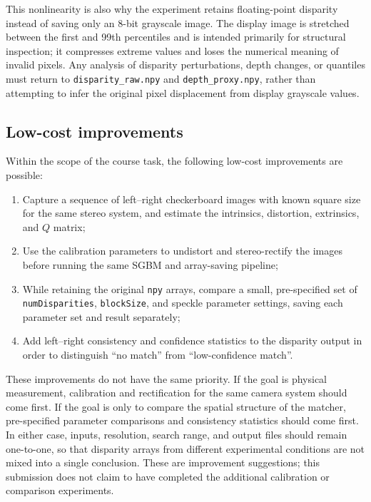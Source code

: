 This nonlinearity is also why the experiment retains floating-point disparity instead of saving only an 8-bit grayscale image. The display image is stretched between the first and 99th percentiles and is intended primarily for structural inspection; it compresses extreme values and loses the numerical meaning of invalid pixels. Any analysis of disparity perturbations, depth changes, or quantiles must return to \texttt{disparity\_raw.npy} and \texttt{depth\_proxy.npy}, rather than attempting to infer the original pixel displacement from display grayscale values.

\subsection{Low-cost improvements}

Within the scope of the course task, the following low-cost improvements are possible:

\begin{enumerate}
  \item Capture a sequence of left--right checkerboard images with known square size for the same stereo system, and estimate the intrinsics, distortion, extrinsics, and $Q$ matrix;
  \item Use the calibration parameters to undistort and stereo-rectify the images before running the same SGBM and array-saving pipeline;
  \item While retaining the original \texttt{npy} arrays, compare a small, pre-specified set of \texttt{numDisparities}, \texttt{blockSize}, and speckle parameter settings, saving each parameter set and result separately;
  \item Add left--right consistency and confidence statistics to the disparity output in order to distinguish ``no match'' from ``low-confidence match''.
\end{enumerate}

These improvements do not have the same priority. If the goal is physical measurement, calibration and rectification for the same camera system should come first. If the goal is only to compare the spatial structure of the matcher, pre-specified parameter comparisons and consistency statistics should come first. In either case, inputs, resolution, search range, and output files should remain one-to-one, so that disparity arrays from different experimental conditions are not mixed into a single conclusion. These are improvement suggestions; this submission does not claim to have completed the additional calibration or comparison experiments.
